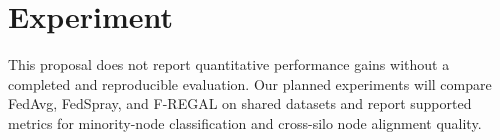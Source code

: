 \section{Experiment}
This proposal does not report quantitative performance gains without a completed and reproducible evaluation. Our planned experiments will compare FedAvg, FedSpray, and F-REGAL on shared datasets and report supported metrics for minority-node classification and cross-silo node alignment quality.